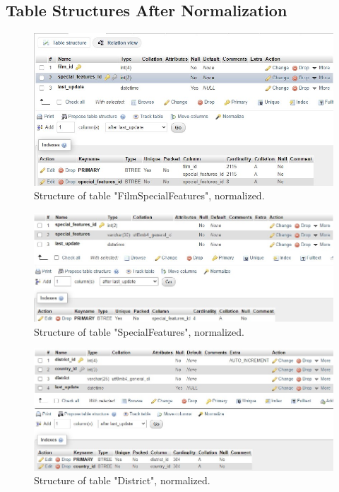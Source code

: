 \documentclass{article}
\begin{document}
	\subsection{Table Structures After Normalization}
		\begin{figure}[H]
			\includegraphics[width=\textwidth]{table_filmspecialfeatures_nstruct}
			\caption{Structure of table "Film\textunderscore Special\textunderscore Features", normalized.}
		\end{figure}
		\begin{figure}[H]
			\includegraphics[width=\textwidth]{table_specialfeatures_nstruct}
			\caption{Structure of table "Special\textunderscore Features", normalized.}
		\end{figure}
		\begin{figure}[H]
			\includegraphics[width=\textwidth]{table_district_nstruct}
			\caption{Structure of table "District", normalized.}
		\end{figure}
\end{document}
